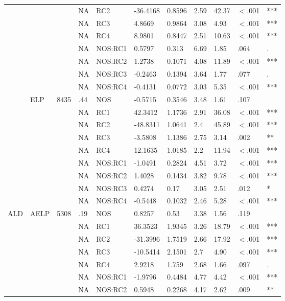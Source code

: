 \begin{table}[ht]
\begin{tabular}{lllllllllll}
   &  &  & NA & RC2 & -36.4168 & 0.8596 & 2.59 & 42.37 & $<$.001 & *** \\ 
   &  &  & NA & RC3 & 4.8669 & 0.9864 & 3.08 & 4.93 & $<$.001 & *** \\ 
   &  &  & NA & RC4 & 8.9801 & 0.8447 & 2.51 & 10.63 & $<$.001 & *** \\ 
   &  &  & NA & NOS:RC1 & 0.5797 & 0.313 & 6.69 & 1.85 & .064 & . \\ 
   &  &  & NA & NOS:RC2 & 1.2738 & 0.1071 & 4.08 & 11.89 & $<$.001 & *** \\ 
   &  &  & NA & NOS:RC3 & -0.2463 & 0.1394 & 3.64 & 1.77 & .077 & . \\ 
   &  &  & NA & NOS:RC4 & -0.4131 & 0.0772 & 3.03 & 5.35 & $<$.001 & *** \\ 
   & ELP & 8435 & .44 & NOS & -0.5715 & 0.3546 & 3.48 & 1.61 & .107 &   \\ 
   &  &  & NA & RC1 & 42.3412 & 1.1736 & 2.91 & 36.08 & $<$.001 & *** \\ 
   &  &  & NA & RC2 & -48.8311 & 1.0641 & 2.4 & 45.89 & $<$.001 & *** \\ 
   &  &  & NA & RC3 & -3.5808 & 1.1386 & 2.75 & 3.14 & .002 & ** \\ 
   &  &  & NA & RC4 & 12.1635 & 1.0185 & 2.2 & 11.94 & $<$.001 & *** \\ 
   &  &  & NA & NOS:RC1 & -1.0491 & 0.2824 & 4.51 & 3.72 & $<$.001 & *** \\ 
   &  &  & NA & NOS:RC2 & 1.4028 & 0.1434 & 3.82 & 9.78 & $<$.001 & *** \\ 
   &  &  & NA & NOS:RC3 & 0.4274 & 0.17 & 3.05 & 2.51 & .012 & * \\ 
   &  &  & NA & NOS:RC4 & -0.5448 & 0.1032 & 2.46 & 5.28 & $<$.001 & *** \\ 
  ALD & AELP & 5308 & .19 & NOS & 0.8257 & 0.53 & 3.38 & 1.56 & .119 &   \\ 
   &  &  & NA & RC1 & 36.3523 & 1.9345 & 3.26 & 18.79 & $<$.001 & *** \\ 
   &  &  & NA & RC2 & -31.3996 & 1.7519 & 2.66 & 17.92 & $<$.001 & *** \\ 
   &  &  & NA & RC3 & -10.5414 & 2.1501 & 2.7 & 4.90 & $<$.001 & *** \\ 
   &  &  & NA & RC4 & 2.9218 & 1.759 & 2.68 & 1.66 & .097 & . \\ 
   &  &  & NA & NOS:RC1 & -1.9796 & 0.4484 & 4.77 & 4.42 & $<$.001 & *** \\ 
   &  &  & NA & NOS:RC2 & 0.5948 & 0.2268 & 4.17 & 2.62 & .009 & ** \\ 

\end{tabular}
\end{table}
